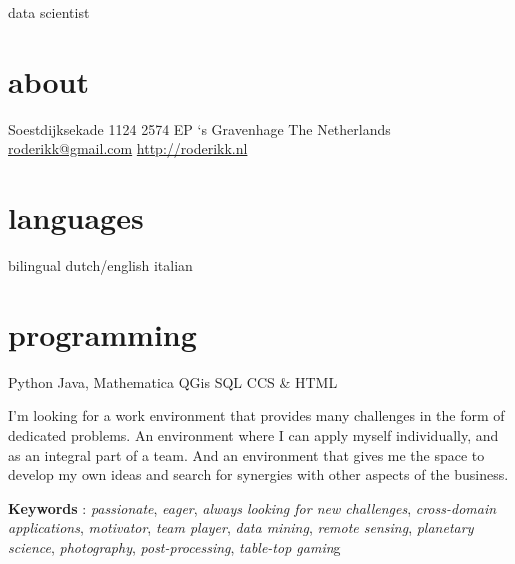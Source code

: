 \documentclass[]{friggeri-cv}
\begin{document}
       {data scientist}


\begin{aside}
  \section{about}
    Soestdijksekade 1124
    2574 EP `s Gravenhage
    The Netherlands
    ~
    \href{mailto:roderikk@gmail.com}{roderikk@gmail.com}
    \href{http://roderikk.nl}{http://roderikk.nl}
  \section{languages}
    bilingual dutch/english
    italian
  \section{programming}
    Python
    Java, Mathematica
    QGis
    SQL
    CCS \& HTML
\end{aside}


I'm looking for a work environment that provides many challenges in the form of dedicated problems.
An environment where I can apply myself individually, and as an integral part of a team.
And an environment that gives me the space to develop my own ideas and search for synergies with other aspects of the business.


\textbf{Keywords} : 
\emph{passionate},
\emph{eager},
\emph{always looking for new challenges},
\emph{cross-domain applications},
\emph{motivator},
\emph{team player},
\emph{data mining},
\emph{remote sensing},
\emph{planetary science},
\emph{photography},
\emph{post-processing},
\emph{table-top gamin}g
\end{document}

